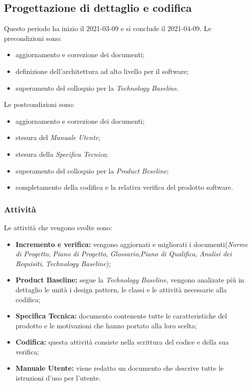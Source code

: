 \subsection{Progettazione di dettaglio e codifica}
Questo periodo ha inizio il 2021-03-09 e si conclude il 2021-04-09.
Le precondizioni sono:
\begin{itemize}
	\item aggiornamento e correzione dei documenti;
	\item definizione dell'architettura ad alto livello per il software;
	\item  superamento del colloquio per la \textit{Technology Baseline}.
\end{itemize}
Le postcondizioni sono:
\begin{itemize}
	\item aggiornamento e correzione dei documenti;
	\item stesura del \textit{Manuale Utente};
	\item stesura della \textit{Specifica Tecnica};
	\item superamento del colloquio per la \textit{Product Beseline};
	\item completamento della codifica e la relativa verifica del prodotto software.
\end{itemize}
\subsubsection{Attività}
Le attività che vengono svolte sono:
\begin{itemize}
	\item \textbf{Incremento e verifica:} vengono aggiornati e migliorati i documenti(\textit{Norme di Progetto}, \textit{Piano di Progetto}, \textit{Glossario},\textit{Piano di Qualifica}, \textit{Analisi dei Requisiti}, \textit{Technology Baseline});
	\item \textbf{Product Baseline:} segue la \textit{Technology Baseline}, vengono analizate più in dettaglio le unità i design pattern, le classi e le attività necessarie alla codifica;
	\item \textbf{Specifica Tecnica:} documento contenente tutte le caratteristiche del prodotto e le motivazioni che hanno portato alla loro scelta;
	\item \textbf{Codifica:} questa attività consiste nella scrittura del codice e della sua verifica;
	\item \textbf{Manuale Utente:} viene redatto un documento che descrive tutte le istruzioni d'uso per l'utente.
\end{itemize}
